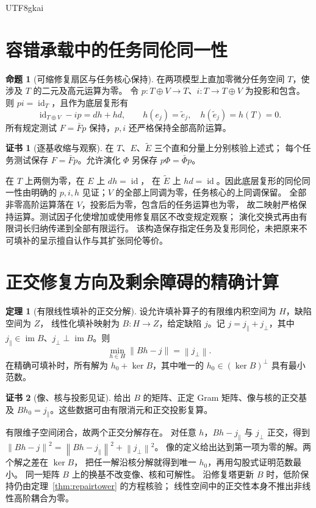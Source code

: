 \documentclass[12pt]{report}
\makeatletter
\theoremstyle{definition}
\newtheorem{theorem}{定理}[chapter]
\newtheorem{proposition}{命题}[chapter]
\newtheorem{Certificate}{证书}[chapter]
\renewenvironment{proof}[1][\proofname]{\par
  \pushQED{\qed}\normalfont
  \topsep6\p@\@plus6\p@\relax
  \trivlist
  \item[\hskip\labelsep\normalfont #1\@addpunct{.}]\ignorespaces
}{
  \popQED\endtrivlist\@endpefalse
}
\newcommand{\id}{\operatorname{id}}
\newcommand{\im}{\operatorname{im}}
\newcommand{\norm}[1]{\left\lVert#1\right\rVert}
\makeatother
\begin{document}
\begin{CJK*}{UTF8}{gkai}
\section{容错承载中的任务同伦同一性}
\begin{proposition}[可缩修复扇区与任务核心保持]
\label{prop:rich-task-core}
在两项模型上直加零微分任务空间 \(T\)，使涉及 \(T\) 的二元及高元运算为零。
令 \(p:T\oplus V\to T\)、\(i:T\to T\oplus V\) 为投影和包含。
则 \(pi=\id_T\)，且作为底层复形有
\[
\id_{T\oplus V}-ip=dh+hd,
\qquad h(e_j)=\widetilde e_j,\quad h(\widetilde e_j)=h(T)=0.
\]
所有规定测试 \(F=\bar Fp\) 保持，\(p,i\) 还严格保持全部高阶运算。
\end{proposition}
\begin{Certificate}[逐基收缩与观察]
在 \(T\)、\(E\)、\(\widetilde E\) 三个直和分量上分别核验上述式；
每个任务测试保存 \(F=\bar Fp\)。允许演化 \(\Phi\) 另保存
\(p\Phi=\bar\Phi p\)。
\end{Certificate}
\begin{proof}
在 \(T\) 上两侧为零，在 \(E\) 上 \(dh=\id\)，
在 \(\widetilde E\) 上 \(hd=\id\)。因此底层复形的同伦同一性由明确的
\(p,i,h\) 见证；\(V\) 的全部上同调为零，任务核心的上同调保留。
全部非零高阶运算落在 \(V\)，投影后为零，包含后的任务运算也为零，
故二映射严格保持运算。测试因子化使增加或使用修复扇区不改变规定观察；
演化交换式再由有限词长归纳传递到全部有限运行。
该构造保存指定任务及复形同伦，未把原来不可填补的呈示擅自认作与其扩张同伦等价。
\end{proof}

\section{正交修复方向及剩余障碍的精确计算}
\begin{theorem}[有限线性填补的正交分解]
\label{thm:orthogonal-filler}
设允许填补算子的有限维内积空间为 \(H\)，缺陷空间为 \(Z\)，
线性化填补映射为 \(B:H\to Z\)，给定缺陷 \(j\)。记
\(j=j_{\parallel}+j_{\perp}\)，其中
\(j_{\parallel}\in\im B\)、\(j_{\perp}\perp\im B\)。则
\[
\min_{h\in H}\norm{Bh-j}=\norm{j_{\perp}}.
\]
在精确可填补时，所有解为 \(h_0+\ker B\)，其中唯一的
\(h_0\in(\ker B)^\perp\) 具有最小范数。
\end{theorem}
\begin{Certificate}[像、核与投影见证]
给出 \(B\) 的矩阵、正定 Gram 矩阵、像与核的正交基及
\(Bh_0=j_{\parallel}\)。这些数据可由有限消元和正交投影复算。
\end{Certificate}
\begin{proof}
有限维子空间闭合，故两个正交分解存在。
对任意 \(h\)，\(Bh-j_{\parallel}\) 与 \(j_{\perp}\) 正交，得到
\(\norm{Bh-j}^2=\norm{Bh-j_{\parallel}}^2+\norm{j_{\perp}}^2\)。
像的定义给出达到第一项为零的解。两个解之差在 \(\ker B\)，
把任一解沿核分解就得到唯一 \(h_0\)，再用勾股式证明范数最小。
同一矩阵 \(B\) 上的换基不改变像、核和可解性。
沿修复塔更新 \(B\) 时，低阶保持仍由定理~\ref{thm:repairtower} 的方程核验；
线性空间中的正交性本身不推出非线性高阶耦合为零。
\end{proof}


\end{CJK*}
\end{document}
